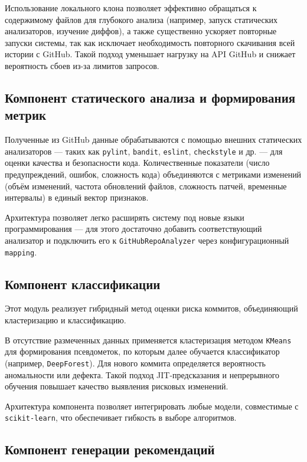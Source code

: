 Использование локального клона позволяет эффективно обращаться к содержимому файлов для глубокого анализа (например, запуск статических анализаторов, изучение диффов), а также существенно ускоряет повторные запуски системы, так как исключает необходимость повторного скачивания всей истории с GitHub. Такой подход уменьшает нагрузку на API GitHub и снижает вероятность сбоев из-за лимитов запросов.

\subsection{Компонент статического анализа и формирования метрик}

Полученные из GitHub данные обрабатываются с помощью внешних статических анализаторов — таких как \texttt{pylint}, \texttt{bandit}, \texttt{eslint}, \texttt{checkstyle} и др. — для оценки качества и безопасности кода. Количественные показатели (число предупреждений, ошибок, сложность кода) объединяются с метриками изменений (объём изменений, частота обновлений файлов, сложность патчей, временные интервалы) в единый вектор признаков.

Архитектура позволяет легко расширять систему под новые языки программирования — для этого достаточно добавить соответствующий анализатор и подключить его к \texttt{GitHubRepoAnalyzer} через конфигурационный \texttt{mapping}.

\subsection{Компонент классификации}

Этот модуль реализует гибридный метод оценки риска коммитов, объединяющий кластеризацию и классификацию.

В отсутствие размеченных данных применяется кластеризация методом \texttt{KMeans} для формирования псевдометок, по которым далее обучается классификатор (например, \texttt{DeepForest}). Для нового коммита определяется вероятность аномальности или дефекта. Такой подход JIT-предсказания и непрерывного обучения повышает качество выявления рисковых изменений.

Архитектура компонента позволяет интегрировать любые модели, совместимые с \texttt{scikit-learn}, что обеспечивает гибкость в выборе алгоритмов.

\subsection{Компонент генерации рекомендаций}

